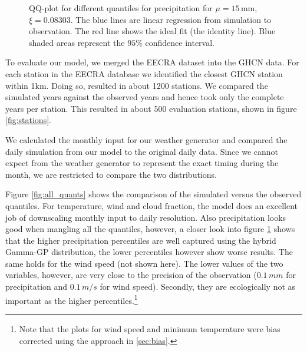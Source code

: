\begin{refsection}
\begin{figure}
	\caption[QQ-plots for different quantiles for precipitation]{QQ-plot for different quantiles for precipitation for ${\mu=15\, \mathrm{mm}}$, $\xi=0.08303$. The blue lines are linear regression from simulation to observation. The red line shows the ideal fit (the identity line). Blue shaded areas represent the $95\%$ confidence interval.}
	\label{fig:precip_quants}
\end{figure}
%

To evaluate our model, we merged the EECRA dataset into the GHCN data. For each station in the EECRA database we identified the closest GHCN station within 1km. Doing so, resulted in about 1200 stations. We compared the simulated years against the observed years and hence took only the complete years per station. This resulted in about 500 evaluation stations, shown in figure \ref{fig:stations}.

We calculated the monthly input for our weather generator and compared the daily simulation from our model to the original daily data. Since we cannot expect from the weather generator to represent the exact timing during the month, we are restricted to compare the two distributions.

Figure \ref{fig:all_quants} shows the comparison of the simulated versus the observed quantiles. For temperature, wind and cloud fraction, the model does an excellent job of downscaling monthly input to daily resolution. Also precipitation looks good when mangling all the quantiles, however, a closer look into figure \ref{fig:precip_quants} shows that the higher precipitation percentiles are well captured using the hybrid Gamma-GP distribution, the lower percentiles however show worse results. The same holds for the wind speed (not shown here). The lower values of the two variables, however, are very close to the precision of the observation ($0.1\, \unit{mm}$ for precipitation and $0.1\, \unit{m/s}$ for wind speed). Secondly, they are ecologically not as important as the higher percentiles.\footnote{Note that the plots for wind speed and minimum temperature were bias corrected using the approach in \autoref{sec:bias}.}


\end{refsection}

